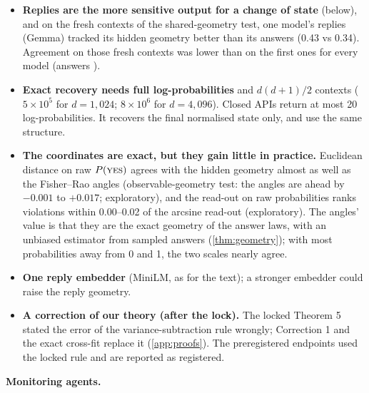 \begin{itemize}
\item \textbf{Replies are the more sensitive output for a change of state} (below), and on the fresh contexts of the shared-geometry test, one model's replies (Gemma) tracked its hidden geometry better than its answers (0.43 vs 0.34). Agreement on those fresh contexts was lower than on the first ones for every model (answers \GSixAns).
\item \textbf{Exact recovery needs full log-probabilities} and $d(d+1)/2$ contexts ($5\times10^5$ for $d=1{,}024$; $8\times10^6$ for $d=4{,}096$). Closed APIs return at most 20 log-probabilities. It recovers the final normalised state only, and \citet{carlini2024stealing,finlayson2024logits} use the same structure.
\item \textbf{The coordinates are exact, but they gain little in practice.} Euclidean distance on raw $P(\textsc{yes})$ agrees with the hidden geometry almost as well as the Fisher--Rao angles (observable-geometry test: the angles are ahead by $-0.001$ to $+0.017$; exploratory), and the read-out on raw probabilities ranks violations within 0.00--0.02 of the arcsine read-out (exploratory). The angles' value is that they are the exact geometry of the answer laws, with an unbiased estimator from sampled answers (\cref{thm:geometry}); with most probabilities away from 0 and 1, the two scales nearly agree.
\item \textbf{One reply embedder} (MiniLM, as for the text); a stronger embedder could raise the reply geometry.
\item \textbf{A correction of our theory (after the lock).} The locked Theorem 5 stated the error of the variance-subtraction rule wrongly; Correction 1 and the exact cross-fit replace it (\cref{app:proofs}). The preregistered endpoints used the locked rule and are reported as registered.
\end{itemize}
\textbf{Monitoring agents.}

